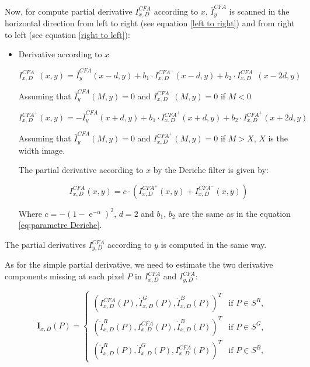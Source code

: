 \documentclass[twoside]{article}
\newcommand\Smo{\bar} %
\DeclareMathOperator{\e}{e}
\begin{document}
Now, for compute partial derivative $I^{CFA}_{x,D}$ according to $x$, $\Smo {I}^{CFA}_y$ is scanned in the horizontal direction from left to right (see equation \eqref{left to right})  and from right to left (see equation \eqref{right to left}):


\begin{itemize}
	
	
	\item Derivative according to $x$ 
	
	
	\begin{equation}
	\label{left to right}
	I_{x,D}^{{CFA}^-}(x,y)= \Smo {I}^{CFA}_y(x-d,y) + b_1 \cdot I^{{CFA}^-}_{x,D}(x-d,y) + b_2 \cdot  I^{{CFA}^-}_{x,D}(x-2d,y)
	\end{equation}
	
	Assuming that  $\Smo {I}^{CFA}_y(M,y)=0$ and $I^{{CFA}^-}_{x,D}(M,y)=0$ if $M<0$ 
	
	
	\begin{equation}
	\label{right to left}
	I^{{CFA}^+}_{x,D}(x,y)= -\Smo {I}^{CFA}_y(x+d,y) + b_1 \cdot I^{{CFA}^+}_{x,D}(x+d,y) + b_2 \cdot I^{{CFA}^+}_{x,D}(x+2d,y)
	\end{equation}
	
	Assuming that $\Smo {I}^{CFA}_y(M,y)=0$ and $I^{{CFA}^+}_{x,D}(M,y)=0$ if $M>X$, $X$ is the width image.  
	

	
	The partial derivative according to $x$ by the Deriche filter is given by:	
	
	\begin{equation}
	I^{CFA}_{x,D}(x,y)=c\cdot\left(I^{{CFA}^+}_{x,D}(x,y) + I^{{CFA}^-}_{x,D}(x,y)\right)
	\end{equation}
	
	
	
	
	Where $c=-(1-\e^{-\alpha})^2$, $d=2$ and  $b_1$, $b_2$ are the same as in the equation \eqref{eq:parametre Deriche}.
	
	
	
	
\end{itemize}


The partial derivatives $I_{y,D}^{CFA}$ according to $y$ is computed in the same way.


As for the simple partial derivative, we need to estimate the two derivative components missing at each pixel $P$ in $I_{x,D}^{CFA}$ and $I_{y,D}^{CFA}$: 	


\begin{equation}
\dot{\textbf{I}}_{x,D}(P) = \left\lbrace
\begin{array}{cl}
\left( I_{x,D}^{CFA}(P), \dot{I}^G_{x,D}(P), \dot{I}^B_{x,D}(P) \right)^T & \text{if $P \in S^{R}$,}\\
\left( \dot{I}^R_{x,D}(P), I_{x,D}^{CFA}(P), \dot{I}^B_{x,D}(P) \right)^T & \text{if $P \in S^G$,}\\
\left( \dot{I}^R_{x,D}(P), \dot{I}^G_{x,D}(P), I_{x,D}^{CFA}(P) \right)^T & \text{if $P \in S^{B}$,}
\end{array}\right.
\label{eq:I^D_p_x}
\end{equation}
\end{document}
